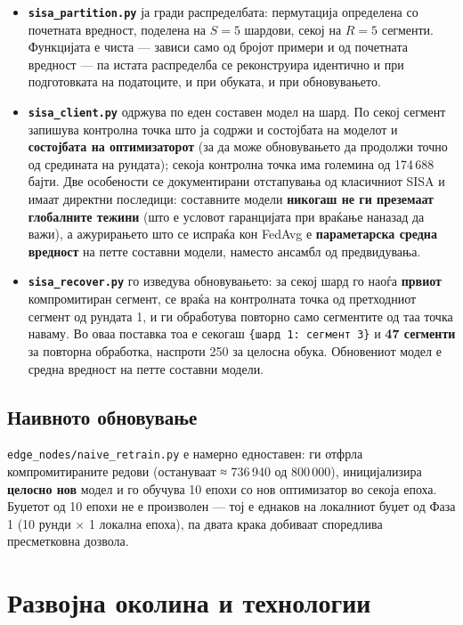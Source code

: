 \begin{itemize}
  \item \textbf{\texttt{sisa\_partition.py}} ја гради распределбата: пермутација определена со почетната вредност, поделена на $S = 5$ шардови, секој на $R = 5$ сегменти. Функцијата е чиста --- зависи само од бројот примери и од почетната вредност --- па истата распределба се реконструира идентично и при подготовката на податоците, и при обуката, и при обновувањето.
  \item \textbf{\texttt{sisa\_client.py}} одржува по еден составен модел на шард. По секој сегмент запишува контролна точка што ја содржи и состојбата на моделот и \textbf{состојбата на оптимизаторот} (за да може обновувањето да продолжи точно од средината на рундата); секоја контролна точка има големина од 174\,688 бајти. Две особености се документирани отстапувања од класичниот SISA и имаат директни последици: составните модели \textbf{никогаш не ги преземаат глобалните тежини} (што е условот гаранцијата при враќање наназад да важи), а ажурирањето што се испраќа кон FedAvg е \textbf{параметарска средна вредност} на петте составни модели, наместо ансамбл од предвидувања.
  \item \textbf{\texttt{sisa\_recover.py}} го изведува обновувањето: за секој шард го наоѓа \textbf{првиот} компромитиран сегмент, се враќа на контролната точка од претходниот сегмент од рундата 1, и ги обработува повторно само сегментите од таа точка наваму. Во оваа поставка тоа е секогаш \texttt{\{шард 1: сегмент 3\}} и \textbf{47 сегменти} за повторна обработка, наспроти 250 за целосна обука. Обновениот модел е средна вредност на петте составни модели.
\end{itemize}

\subsection{Наивното обновување}

\texttt{edge\_nodes/naive\_retrain.py} е намерно едноставен: ги отфрла компромитираните редови
(остануваат ≈ 736\,940 од 800\,000), иницијализира \textbf{целосно нов} модел и го обучува 10
епохи со нов оптимизатор во секоја епоха. Буџетот од 10 епохи не е произволен --- тој е
еднаков на локалниот буџет од Фаза 1 (10 рунди × 1 локална епоха), па двата крака добиваат
споредлива пресметковна дозвола.

\section{Развојна околина и технологии}

